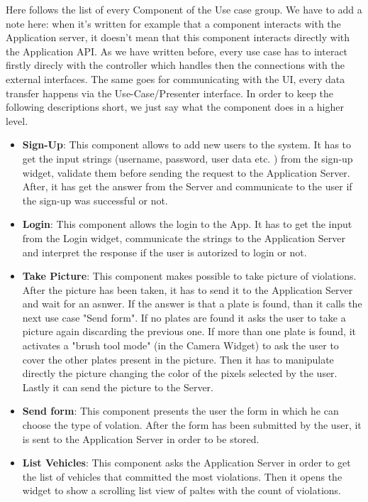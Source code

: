 Here follows the list of every Component of the Use case group. We have to add a note here: when it's written for example that a component interacts with the Application server, it doesn't mean that this component interacts directly with the Application API. As we have written before, every use case has to interact firstly direcly with the controller which handles then the connections with the external interfaces. The same goes for communicating with the UI, every data transfer happens via the Use-Case/Presenter interface. In order to keep the following descriptions short, we just say what the component does in a higher level.


\begin{itemize}
  \item \textbf{Sign-Up}: This component allows to add new users to the system. It has to get the input strings (username, password, user data etc. ) from the sign-up widget, validate them before sending the request to the Application Server. After, it has get the answer from the Server and communicate to the user if the sign-up was successful or not.
  \item \textbf{Login}: This component allows the login to the App. It has to get the input from the Login widget, communicate the strings to the Application Server and interpret the response if the user is autorized to login or not.
  \item \textbf{Take Picture}: This component makes possible to take picture of violations. After the picture has been taken, it has to send it to the Application Server and wait for an asnwer. If the answer is that a plate is found, than it calls the next use case "Send form". If no plates are found it asks the user to take a picture again discarding the previous one. If more than one plate is found, it activates a "brush tool mode" (in the Camera Widget) to ask the user to cover the other plates present in the picture. Then it has to manipulate directly the picture changing the color of the pixels selected by the user. Lastly it can send the picture to the Server.
  \item \textbf{Send form}: This component presents the user the form in which he can choose the type of volation. After the form has been submitted by the user, it is sent to the Application Server in order to be stored.
  \item \textbf{List Vehicles}: This component asks the Application Server in order to get the list of vehicles that committed the most violations. Then it opens the widget to show a scrolling list view of paltes with the count of violations.

\end{itemize}
